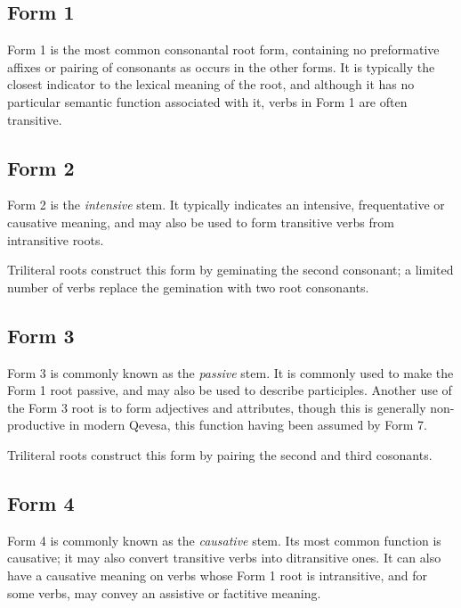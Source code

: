 \documentclass[grammar]{subfiles}
\begin{document}
  \subsection{Form 1}
  \label{ssec:dev_verb_form_1}

  Form 1 is the most common consonantal root form, containing no preformative affixes or pairing of consonants as occurs in the other forms.  It is typically the closest indicator to the lexical meaning of the root, and although it has no particular semantic function associated with it, verbs in Form 1 are often transitive.

  \subsection{Form 2}
  \label{ssec:dev_verb_form_2}

  Form 2 is the \emph{intensive} stem.  It typically indicates an intensive, frequentative or causative meaning, and may also be used to form transitive verbs from intransitive roots. 

  Triliteral roots construct this form by geminating the second consonant; a limited number of verbs replace the gemination with two root consonants.  %

  \subsection{Form 3}
  \label{ssec:dev_verb_form_3}

  Form 3 is commonly known as the \emph{passive} stem.
  It is commonly used to make the Form 1 root passive, and may also be used to describe participles.
  Another use of the Form 3 root is to form adjectives and attributes, though this is generally non-productive in modern Qevesa, this function having been assumed by Form 7.

  Triliteral roots construct this form by pairing the second and third cosonants.  %

  \subsection{Form 4}
  \label{ssec:dev_verb_form_4}

  Form 4 is commonly known as the \emph{causative} stem. 
  Its most common function is causative; it may also convert transitive verbs into ditransitive ones.
  It can also have a causative meaning on verbs whose Form 1 root is intransitive, and for some verbs, may convey an assistive or factitive meaning.
\end{document}
